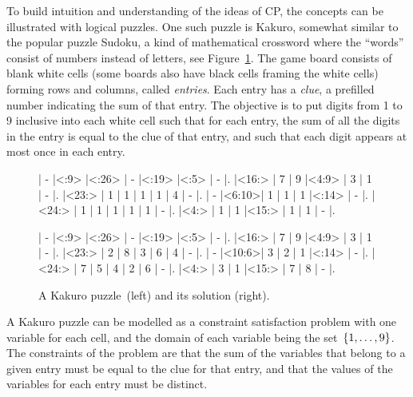 \documentclass[a4paper,11pt]{article}
\numberwithin{equation}{section}
\begin{document}
To build intuition and understanding of the ideas of CP,
the concepts can be illustrated with logical puzzles. One such
puzzle is Kakuro, somewhat similar to the popular puzzle Sudoku,
a kind of mathematical crossword where the ``words'' consist
of numbers instead of letters, see Figure~\ref{fig:kakuro}.
The game board consists of 
blank white cells (some boards also have black cells framing the white cells)
forming rows and columns, called \emph{entries}.
Each entry has a \emph{clue}, a prefilled number indicating the sum of that entry.
The objective is to put digits from 1 to 9 inclusive into each white cell such 
that for each entry,
the sum of all the digits in the entry is equal to the clue of that entry,
and such that each digit appears at most once in each entry.

\begin{figure}
  \centering
  \begin{minipage}{.45\textwidth}
    
    \begin{Kakuro}{6}{6}
      |  -   |<:9>  |<:26> |  -   |<:19> |<:5>  |  -   |.
      |<16:> |  7   |  9   |<4:9> |  3   |  1   |  -   |.
      |<23:> |  1   |  1   |  1   |  1   |  4   |  -   |.
      |  -   |<6:10>|  1   |  1   |  1   |<:14> |  -   |.
      |<24:> |  1   |  1   |  1   |  1   |  1   |  -   |.
      |<4:>  |  1   |  1   |<15:> |  1   |  1   |  -   |.
    \end{Kakuro}
  \end{minipage}
  \begin{minipage}{.45\textwidth}
    \PuzzleSolution
    \begin{Kakuro}{6}{6}
      |  -   |<:9>  |<:26> |  -   |<:19> |<:5>  |  -   |.
      |<16:> |  7   |  9   |<4:9> |  3   |  1   |  -   |.
      |<23:> |  2   |  8   |  3   |  6   |  4   |  -   |.
      |  -   |<10:6>|  3   |  2   |  1   |<:14> |  -   |.
      |<24:> |  7   |  5   |  4   |  2   |  6   |  -   |.
      |<4:>  |  3   |  1   |<15:> |  7   |  8   |  -   |.
    \end{Kakuro}
  \end{minipage}
  \caption{A Kakuro puzzle~\protect\footnotemark (left) and its solution (right).}
  \label{fig:kakuro}
\end{figure}


A Kakuro puzzle can be modelled as a constraint satisfaction problem with one variable
for each cell, and the domain of each variable being the set~$\left\{1,\ldots,9\right\}$.
The constraints of the problem are that the sum of the variables that
belong to a given entry must be equal to the clue for that entry, and that the
values of the variables for each entry must be distinct.
\end{document}
